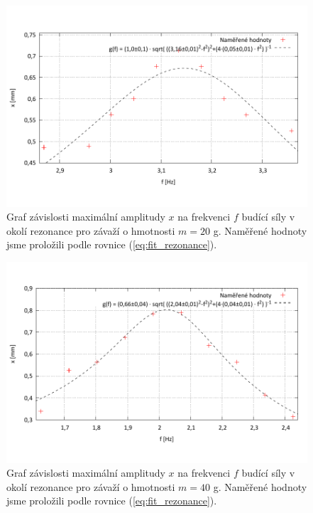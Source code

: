 \documentclass[english]{article}
\begin{document}
	\begin{figure}[h]
	\begin{center}
	\vspace*{-1cm}
		\includegraphics[width=\linewidth]{../gnuplot/10_lho_rezonance_20g.pdf}
	\vspace*{-2cm}
			\caption{Graf závislosti maximální amplitudy $x$ na frekvenci $f$ budící síly v okolí rezonance pro závaží o hmotnosti $m=20$ g. Naměřené hodnoty jsme proložili podle rovnice (\ref{eq:fit_rezonance}).}
			\label{fig:lho_rezo_20g}
	\end{center}
	\end{figure}
	
	\begin{figure}[h!]
	\begin{center}
		\vspace*{-1cm}
		\includegraphics[width=\linewidth]{../gnuplot/10_lho_rezonance_40g.pdf}
	\vspace*{-2cm}
			\caption{Graf závislosti maximální amplitudy $x$ na frekvenci $f$ budící síly v okolí rezonance pro závaží o hmotnosti $m=40$ g. Naměřené hodnoty jsme proložili podle rovnice (\ref{eq:fit_rezonance}).}
			\label{fig:lho_rezo_40g}
	\end{center}
	\end{figure}
		
\end{document}
